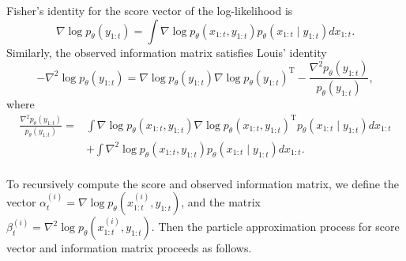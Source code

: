 \documentclass[mstat,12pt]{unswthesis}  %
\numberwithin{equation}{section}
\begin{document}
\noindent Fisher’s identity for the score vector of the log-likelihood is
\begin{equation}\label{score}
\nabla \log p_{\theta}\left(y_{1: t}\right)=\int \nabla \log p_{\theta}\left(x_{1: t}, y_{1: t}\right) p_{\theta}\left(x_{1: t} \mid y_{1: t}\right) d x_{1: t}.\end{equation}
Similarly, the observed information matrix satisfies Louis’ identity
\begin{equation}-\nabla^{2} \log p_{\theta}\left(y_{1: t}\right)=\nabla \log p_{\theta}\left(y_{1: t}\right) \nabla \log p_{\theta}\left(y_{1: t}\right)^{\mathrm{T}}-\frac{\nabla^{2} p_{\theta}\left(y_{1: t}\right)}{p_{\theta}\left(y_{1: t}\right)},\end{equation}
where
\begin{equation}\label{info}
\begin{aligned}
\frac{\nabla^{2} p_{\theta}\left(y_{1: t}\right)}{p_{\theta}\left(y_{1: t}\right)}=& \int \nabla \log p_{\theta}\left(x_{1: t}, y_{1: t}\right) \nabla \log p_{\theta}\left(x_{1: t}, y_{1: t}\right)^{\mathrm{T}} p_{\theta}\left(x_{1: t} \mid y_{1: t}\right) d x_{1: t} \\
&+\int \nabla^{2} \log p_{\theta}\left(x_{1: t}, y_{1: t}\right) p_{\theta}\left(x_{1: t} \mid y_{1: t}\right) d x_{1: t}.
\end{aligned}\end{equation}\\

\noindent To recursively compute the score and observed information matrix, we define the vector $\alpha_{t}^{(i)}=\nabla \log p_{\theta}\left(x_{1: t}^{(i)}, y_{1: t}\right)$, and the matrix $\beta_{t}^{(i)}=\nabla^{2} \log p_{\theta}\left(x_{1: t}^{(i)}, y_{1: t}\right)$. Then the particle approximation process for score vector and information matrix proceeds as follows.\\
\end{document}
